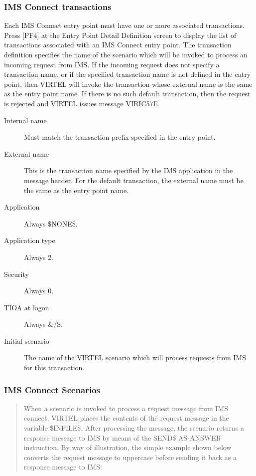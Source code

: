 \documentclass[letterpaper,10pt,english]{sphinxmanual}
\begin{document}
\subsubsection{IMS Connect transactions}
\label{\detokenize{connectivity_guide:ims-connect-transactions}}
Each IMS Connect entry point must have one or more associated transactions. Press {[}PF4{]} at the Entry Point Detail Definition screen to display the list of transactions associated with an IMS Connect entry point. The transaction definition specifies the name of the scenario which will be invoked to process an incoming request from IMS. If the incoming request does not specify a transaction name, or if the specified transaction name is not defined in the entry point, then VIRTEL will invoke the transaction whose external name is the same as the entry point name. If there is no such default transaction, then the request is rejected and VIRTEL issues message VIRIC57E.


\begin{description}
\item[{Internal name}] \leavevmode
Must match the transaction prefix specified in the entry point.

\item[{External name}] \leavevmode
This is the transaction name specified by the IMS application in the
message header. For the default transaction, the external name must
be the same as the entry point name.

\item[{Application}] \leavevmode
Always \$NONE\$.

\item[{Application type}] \leavevmode
Always 2.

\item[{Security}] \leavevmode
Always 0.

\item[{TIOA at logon}] \leavevmode
Always \&/S.

\item[{Initial scenario}] \leavevmode
The name of the VIRTEL scenario which will process requests from IMS
for this transaction.

\end{description}


\subsubsection{IMS Connect Scenarios}
\label{\detokenize{connectivity_guide:ims-connect-scenarios}}\begin{quote}

When a scenario is invoked to process a request message from IMS connect, VIRTEL places the contents of the request message in the variable \$INFILE\$. After processing the message, the scenario  returns a response message to IMS by means of the SEND\$ AS-ANSWER instruction. By way of illustration, the simple example shown below converts the request message to uppercase before sending it back as a response message to IMS:
\end{quote}
\end{document}
